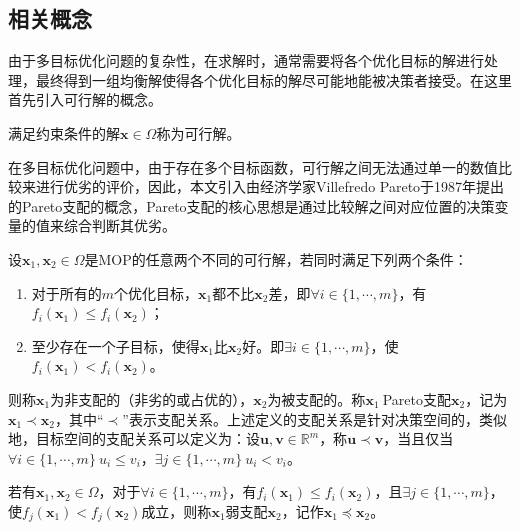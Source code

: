 \subsection{相关概念}
\label{subsec:背景介绍:多目标优化问题:相关概念}
由于多目标优化问题的复杂性，在求解时，通常需要将各个优化目标的解进行处理，最终得到一组均衡解使得各个优化目标的解尽可能地能被决策者接受。在这里首先引入可行解的概念。
\begin{definition}[可行解]
    \label{def:可行解}
    满足约束条件的解$\mathbf{x} \in \Omega$称为可行解。
\end{definition}
\par
在多目标优化问题中，由于存在多个目标函数，可行解之间无法通过单一的数值比较来进行优劣的评价，因此，本文引入由经济学家Villefredo Pareto于1987年提出的Pareto支配的概念，Pareto支配的核心思想是通过比较解之间对应位置的决策变量的值来综合判断其优劣。
\begin{definition}[Pareto支配]
    \label{def:Pareto支配}
    设$\mathbf{x}_1, \mathbf{x}_2 \in \Omega$是MOP的任意两个不同的可行解，若同时满足下列两个条件：
    \begin{enumerate}
        \item 对于所有的$m$个优化目标，$\mathbf{x}_1$都不比$\mathbf{x}_2$差，即$\forall i \in \{ 1, \cdots, m \}$，有$f_i(\mathbf{x}_1) \leq f_i(\mathbf{x}_2)$；
        \item 至少存在一个子目标，使得$\mathbf{x}_1$比$\mathbf{x}_2$好。即$\exists i \in \{ 1, \cdots, m \}$，使$f_i(\mathbf{x}_1) < f_i(\mathbf{x}_2)$。
    \end{enumerate}
    则称$\mathbf{x}_1$为非支配的（非劣的或占优的），$\mathbf{x}_2$为被支配的。称$\mathbf{x}_1 \ $Pareto支配$\mathbf{x}_2$，记为$\mathbf{x}_1 \prec \mathbf{x}_2$，其中“$\prec$”表示支配关系。上述定义的支配关系是针对决策空间的，类似地，目标空间的支配关系可以定义为：设$\mathbf{u}, \mathbf{v} \in \mathbb{R}^m$，称$\mathbf{u} \prec \mathbf{v}$，当且仅当$\forall i \in \{ 1, \cdots, m \} \ u_i \leq v_i$，$\exists j \in  \{ 1, \cdots, m \} \ u_i < v_i$。
\end{definition}
\par
\begin{definition}[弱支配]
    \label{def:弱支配}
    若有$\mathbf{x}_1,\mathbf{x}_2 \in \Omega$，对于$\forall i \in \{ 1, \cdots, m \}$，有$f_i(\mathbf{x}_1) \leq f_i(\mathbf{x}_2)$，且$\exists j \in \{ 1, \cdots, m\}$，使$f_j(\mathbf{x}_1) < f_j(\mathbf{x}_2)$成立，则称$\mathbf{x}_1$弱支配$\mathbf{x}_2$，记作$\mathbf{x}_1 \preceq \mathbf{x}_2$。
\end{definition}
\par
